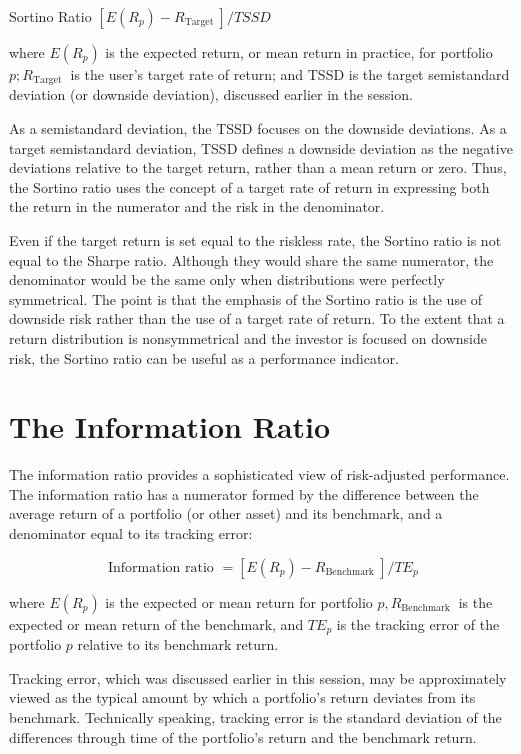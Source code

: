 \documentclass[11pt]{article}
\begin{document}
Sortino Ratio $\left[E\left(R_{p}\right)-R_{\text {Target }}\right] / T S S D$

where $E\left(R_{p}\right)$ is the expected return, or mean return in practice, for portfolio $p ; R_{\text {Target }}$ is the user's target rate of return; and TSSD is the target semistandard deviation (or downside deviation), discussed earlier in the session.

As a semistandard deviation, the TSSD focuses on the downside deviations. As a target semistandard deviation, TSSD defines a downside deviation as the negative deviations relative to the target return, rather than a mean return or zero. Thus, the Sortino ratio uses the concept of a target rate of return in expressing both the return in the numerator and the risk in the denominator.

Even if the target return is set equal to the riskless rate, the Sortino ratio is not equal to the Sharpe ratio. Although they would share the same numerator, the denominator would be the same only when distributions were perfectly symmetrical. The point is that the emphasis of the Sortino ratio is the use of downside risk rather than the use of a target rate of return. To the extent that a return distribution is nonsymmetrical and the investor is focused on downside risk, the Sortino ratio can be useful as a performance indicator.

\section*{The Information Ratio}
The information ratio provides a sophisticated view of risk-adjusted performance. The information ratio has a numerator formed by the difference between the average return of a portfolio (or other asset) and its benchmark, and a denominator equal to its tracking error:


\begin{equation*}
\text { Information ratio }=\left[E\left(R_{p}\right)-R_{\text {Benchmark }}\right] / T E_{p} \tag{5}
\end{equation*}


where $E\left(R_{p}\right)$ is the expected or mean return for portfolio $p, R_{\text {Benchmark }}$ is the expected or mean return of the benchmark, and $T E_{p}$ is the tracking error of the portfolio $p$ relative to its benchmark return.

Tracking error, which was discussed earlier in this session, may be approximately viewed as the typical amount by which a portfolio's return deviates from its benchmark. Technically speaking, tracking error is the standard deviation of the differences through time of the portfolio's return and the benchmark return.
\end{document}
